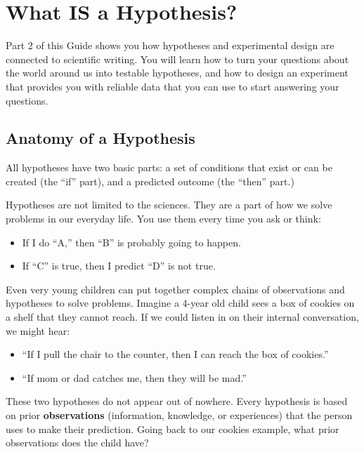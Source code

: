 \documentclass[
]{book}
\providecommand{\tightlist}{%
  \setlength{\itemsep}{0pt}\setlength{\parskip}{0pt}}
\begin{document}
\hypertarget{what-is-a-hypothesis}{%
\chapter{What IS a Hypothesis?}\label{what-is-a-hypothesis}}

Part 2 of this Guide shows you how hypotheses and experimental design are connected to scientific writing. You will learn how to turn your questions about the world around us into testable hypotheses, and how to design an experiment that provides you with reliable data that you can use to start answering your questions.

\hypertarget{hypothesis200}{%
\section{Anatomy of a Hypothesis}\label{hypothesis200}}

All hypotheses have two basic parts: a set of conditions that exist or can be created (the ``if'' part), and a predicted outcome (the ``then'' part.)

Hypotheses are not limited to the sciences. They are a part of how we solve problems in our everyday life. You use them every time you ask or think:

\begin{itemize}
\tightlist
\item
  If I do ``A,'' then ``B'' is probably going to happen.
\item
  If ``C'' is true, then I predict ``D'' is not true.
\end{itemize}

Even very young children can put together complex chains of observations and hypotheses to solve problems. Imagine a 4-year old child sees a box of cookies on a shelf that they cannot reach. If we could listen in on their internal conversation, we might hear:

\begin{itemize}
\tightlist
\item
  ``If I pull the chair to the counter, then I can reach the box of cookies.''
\item
  ``If mom or dad catches me, then they will be mad.''
\end{itemize}

These two hypotheses do not appear out of nowhere. Every hypothesis is based on prior \textbf{observations} (information, knowledge, or experiences) that the person uses to make their prediction. Going back to our cookies example, what prior observations does the child have?
\end{document}
